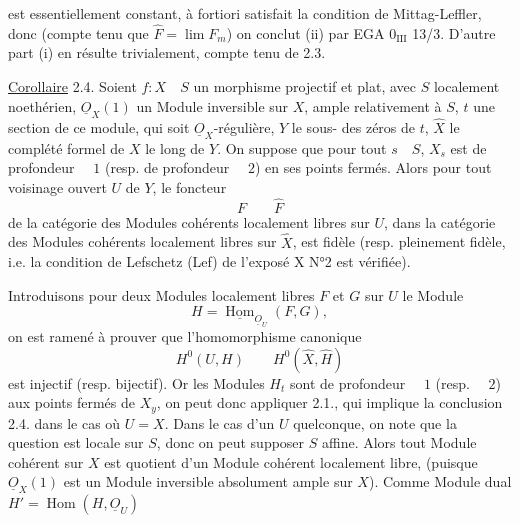 
est essentiellement constant,  à fortiori satisfait la condition de Mittag-Leffler, donc (compte tenu que $\widehat F=\lim F_m$) on conclut (ii) par EGA $0_{\mathrm{III}}$ 13/3. D'autre part (i) en résulte trivialement, compte tenu de 2.3.

\uline{Corollaire} 2.4. Soient $f:X\quad S$ un morphisme projectif et plat, avec $S$ localement noethérien, $\underline O_X(1)$ un Module inversible sur $X$, ample relativement à $S$, $t$ une section de ce module, qui soit $\underline O_X$-régulière, $Y$  le sous- des zéros de $t$, $\widehat X$ le complété formel de $X$ le long de $Y$. On suppose que pour tout $s\quad S$, $X_s$ est de profondeur $\quad1$ (resp. de profondeur $\quad2$) en ses points fermés. Alors pour tout voisinage ouvert $U$ de $Y$, le foncteur
\[
F\qquad\widehat F
\]
de la catégorie des Modules cohérents localement libres sur $U$, dans la catégorie des Modules cohérents localement libres sur $\widehat X$, est fidèle (resp. pleinement fidèle, i.e. la condition  de Lefschetz (Lef) de l'exposé X N°2 est vérifiée).

Introduisons  pour deux Modules localement libres $F$ et $G$ sur $U$ le Module
\[
H=\underline{\operatorname{Hom}}_{\underline O_U}(F,G),
\]
on est ramené à prouver que l'homomorphisme canonique
\[
H^0(U,H)\qquad H^0(\widehat X,\widehat H)
\]
est injectif (resp. bijectif). Or les Modules $H_t$ sont de profondeur $\quad1$ (resp. $\quad2$) aux points fermés de $X_y$, on peut donc appliquer 2.1., qui implique la conclusion 2.4. dans le cas où $U=X$. Dans le cas d'un $U$ quelconque, on note que la question est locale sur $S$, donc on peut supposer $S$ affine. Alors tout Module cohérent sur $X$ est quotient d'un Module cohérent localement libre, (puisque $\underline O_X(1)$ est un Module inversible absolument ample sur $X$). Comme  Module dual $H'=\operatorname{Hom}(H,\underline O_U)$

